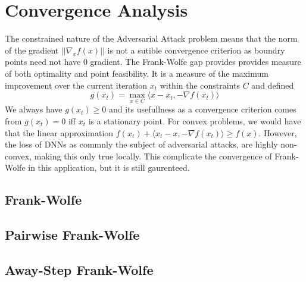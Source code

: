 \documentclass{article}
\begin{document}
\section{Convergence Analysis}
The constrained nature of the Adversarial Attack problem means that the norm of the gradient $||\nabla_x f(x)||$ is not a sutible convergence criterion as boundry points need not have $0$ gradient. 
The Frank-Wolfe gap provides provides measure of both optimality and point feasibility. It is a measure of the maximum improvement over the current iteration $x_t$ within the constraints $C$ and defined
$$g(x_t) = \max_{x\in C} \langle x - x_t, -\nabla f(x_t)\rangle$$
We always have $g(x_t) \geq 0$ and its usefullness as a convergence criterion comes from $g(x_t) = 0$ iff $x_t$ is a stationary point. 
For convex problems, we would have that the linear approximation $f(x_t) + \langle x_t - x, -\nabla f(x_t) \rangle \geq f(x)$. However, the loss of DNNs as commnly the subject of adversarial attacks, are highly non-convex, making this only true locally. This complicate the convergence of Frank-Wolfe in this application, but it is still gaurenteed.

\subsection{Frank-Wolfe}
\subsection{Pairwise Frank-Wolfe}
\subsection{Away-Step Frank-Wolfe}
\end{document}
